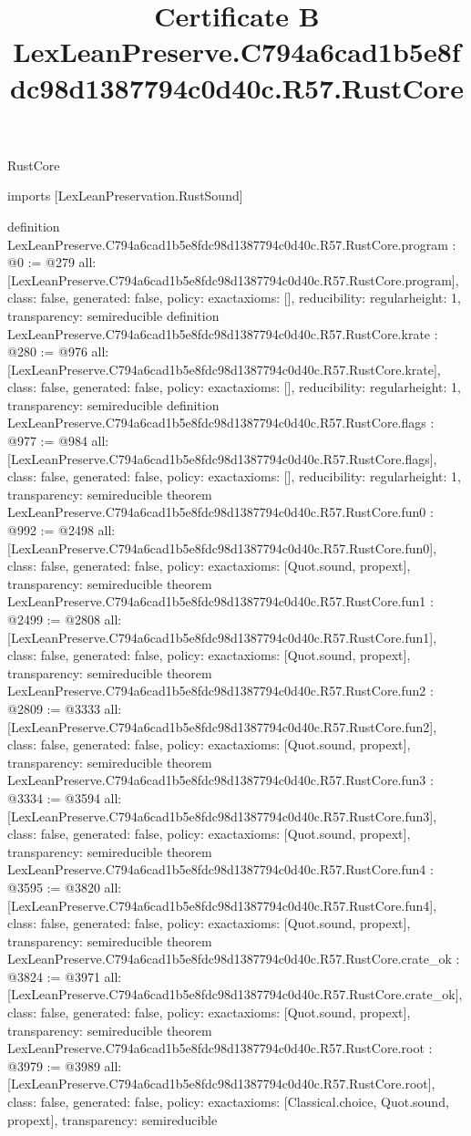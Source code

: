 \begin{lexlean}{RustCore}
\title{Certificate B LexLeanPreserve.C794a6cad1b5e8fdc98d1387794c0d40c.R57.RustCore}
\begin{coremodule}
imports [LexLeanPreservation.RustSound]

definition LexLeanPreserve.C794a6cad1b5e8fdc98d1387794c0d40c.R57.RustCore.program : @0 := @279 {
  all: [LexLeanPreserve.C794a6cad1b5e8fdc98d1387794c0d40c.R57.RustCore.program],
  class: false,
  generated: false,
  policy: exact{axioms: []},
  reducibility: regular{height: 1},
  transparency: semireducible
}
definition LexLeanPreserve.C794a6cad1b5e8fdc98d1387794c0d40c.R57.RustCore.krate : @280 := @976 {
  all: [LexLeanPreserve.C794a6cad1b5e8fdc98d1387794c0d40c.R57.RustCore.krate],
  class: false,
  generated: false,
  policy: exact{axioms: []},
  reducibility: regular{height: 1},
  transparency: semireducible
}
definition LexLeanPreserve.C794a6cad1b5e8fdc98d1387794c0d40c.R57.RustCore.flags : @977 := @984 {
  all: [LexLeanPreserve.C794a6cad1b5e8fdc98d1387794c0d40c.R57.RustCore.flags],
  class: false,
  generated: false,
  policy: exact{axioms: []},
  reducibility: regular{height: 1},
  transparency: semireducible
}
theorem LexLeanPreserve.C794a6cad1b5e8fdc98d1387794c0d40c.R57.RustCore.fun0 : @992 := @2498 {
  all: [LexLeanPreserve.C794a6cad1b5e8fdc98d1387794c0d40c.R57.RustCore.fun0],
  class: false,
  generated: false,
  policy: exact{axioms: [Quot.sound, propext]},
  transparency: semireducible
}
theorem LexLeanPreserve.C794a6cad1b5e8fdc98d1387794c0d40c.R57.RustCore.fun1 : @2499 := @2808 {
  all: [LexLeanPreserve.C794a6cad1b5e8fdc98d1387794c0d40c.R57.RustCore.fun1],
  class: false,
  generated: false,
  policy: exact{axioms: [Quot.sound, propext]},
  transparency: semireducible
}
theorem LexLeanPreserve.C794a6cad1b5e8fdc98d1387794c0d40c.R57.RustCore.fun2 : @2809 := @3333 {
  all: [LexLeanPreserve.C794a6cad1b5e8fdc98d1387794c0d40c.R57.RustCore.fun2],
  class: false,
  generated: false,
  policy: exact{axioms: [Quot.sound, propext]},
  transparency: semireducible
}
theorem LexLeanPreserve.C794a6cad1b5e8fdc98d1387794c0d40c.R57.RustCore.fun3 : @3334 := @3594 {
  all: [LexLeanPreserve.C794a6cad1b5e8fdc98d1387794c0d40c.R57.RustCore.fun3],
  class: false,
  generated: false,
  policy: exact{axioms: [Quot.sound, propext]},
  transparency: semireducible
}
theorem LexLeanPreserve.C794a6cad1b5e8fdc98d1387794c0d40c.R57.RustCore.fun4 : @3595 := @3820 {
  all: [LexLeanPreserve.C794a6cad1b5e8fdc98d1387794c0d40c.R57.RustCore.fun4],
  class: false,
  generated: false,
  policy: exact{axioms: [Quot.sound, propext]},
  transparency: semireducible
}
theorem LexLeanPreserve.C794a6cad1b5e8fdc98d1387794c0d40c.R57.RustCore.crate_ok : @3824 := @3971 {
  all: [LexLeanPreserve.C794a6cad1b5e8fdc98d1387794c0d40c.R57.RustCore.crate_ok],
  class: false,
  generated: false,
  policy: exact{axioms: [Quot.sound, propext]},
  transparency: semireducible
}
theorem LexLeanPreserve.C794a6cad1b5e8fdc98d1387794c0d40c.R57.RustCore.root : @3979 := @3989 {
  all: [LexLeanPreserve.C794a6cad1b5e8fdc98d1387794c0d40c.R57.RustCore.root],
  class: false,
  generated: false,
  policy: exact{axioms: [Classical.choice, Quot.sound, propext]},
  transparency: semireducible
}


\end{coremodule}
\end{lexlean}
